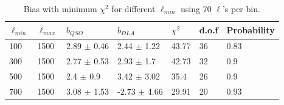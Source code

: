 \documentclass{amsart}
\begin{document}
\begin{center}
\begin{table}[htbp]
\caption{Bias with minimum $\chi^2$  for different $\ell_{min}$ using 70 $\ell$'s per bin.}
\begin{tabular}{p{}p{}p{}p{}p{}p{}p{}} \\ \toprule
$\ell_{min}$ & $\ell_{max}$ & \multicolumn{1}{p{0cm}}{$b_{QSO}$} & $b_{DLA}$ & \multicolumn{1}{p{2cm}}{$\chi^2$} & d.o.f  & Probability\\ \midrule
100  &  1500  &  2.89  $\pm$  0.46  &  2.44  $\pm$  1.22  &  43.77  &  36  &  0.83 \\
300  &  1500  &  2.77  $\pm$  0.53  &  2.93  $\pm$  1.7  &  42.73  &  32  &  0.9 \\
500  &  1500  &  2.4  $\pm$  0.9  &  3.42  $\pm$  3.02  &  35.4  &  26  &  0.9 \\
700  &  1500  &  3.08  $\pm$  1.53  &  -2.73  $\pm$  4.66  &  29.91  &  20  &  0.93 \\
 \bottomrule
\end{tabular}

\end{table}
\end{center}
\end{document}
